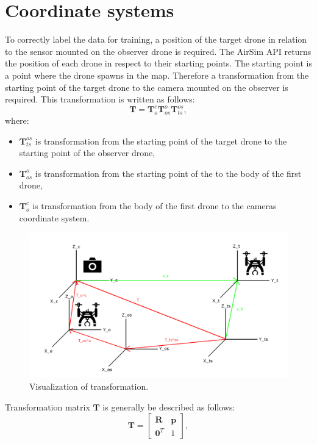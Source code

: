 \documentclass[twoside]{ctuthesis}
\theoremstyle{plain}
\theoremstyle{definition}
\theoremstyle{note}
\begin{document}
\section{Coordinate systems}
To correctly label the data for training, a position of the target drone in relation to the sensor mounted on the observer drone is required. The AirSim API returns the position of each drone in respect to their starting points. The starting point is a point where the drone spawns in the map. Therefore a transformation from the starting point of the target drone to the camera mounted on the observer is required. This transformation is written as follows:
\begin{equation}
	\textbf{T}=\textbf{T}_{o}^{c}\textbf{T}_{os}^{o}\textbf{T}_{ts}^{os},
\end{equation}
where:
\begin{itemize}
	\item $\textbf{T}_{ts}^{os}$ is transformation from the starting point of the target drone to the starting point of the observer drone,
	\item $\textbf{T}_{os}^{o}$ is transformation from the starting point of the  to the body of the first drone,
	\item $\textbf{T}_{o}^{c}$ is transformation from the body of the first drone to the cameras coordinate system.
\end{itemize}
\begin{figure}
	\centering
	\includegraphics[width=\textwidth]{coord_schema.png}
	\caption{Visualization of transformation.}
	\label{fig:trans}
\end{figure}
Transformation matrix $\textbf{T}$ is generally be described as follows:
\begin{equation}
	\textbf{T}=\begin{bmatrix}
		\textbf{R} & \textbf{p}\\
		\textbf{0}^T & 1
	\end{bmatrix},
\end{equation}
\end{document}

